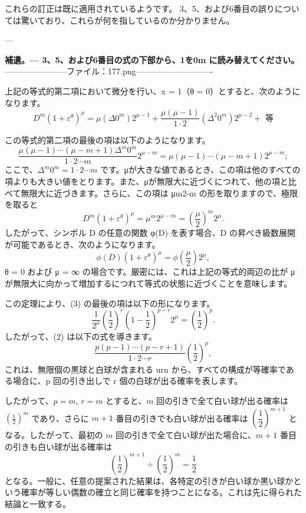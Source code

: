 \documentclass[a4paper,11pt,openany]{ltjsbook}
\begin{document}
これらの訂正は既に適用されているようです。
3、5、および6番目の誤りについては驚いており、これらが何を指しているのか分かりません。

---

\textbf{補遺。--- 3、5、および6番目の式の下部から、1を0m に読み替えてください。}
-----------------------ファイル：177.png----------------------------

上記の等式的第二項において微分を行い、x = 1（θ = 0）とすると、次のようになります。
\[
D^m(1 + \varepsilon^\theta)^\mu
= \mu(\Delta 0^m)2^{\mu-1}
+ \frac{\mu(\mu-1)}{1 \cdot 2}(\Delta^2 0^m)2^{\mu-2}
+ \text{ 等}
\]

この等式的第二項の最後の項は以下のようになります。
\[
\frac{\mu(\mu-1)\cdots (\mu-m+1)\Delta^m 0^m}{1 \cdot 2 \cdots m}2^{\mu-m}
= \mu(\mu-1)\cdots (\mu-m+1)2^{\mu-m};
\]
ここで、\(\Delta^m 0^m = 1 \cdot 2 \cdots m\) です。μが大きな値であるとき、この項は他のすべての項よりも大きい値をとります。また、μが無限大に近づくにつれて、他の項と比べて無限大に近づきます。さらに、この項は μm2{\mu-m} の形を取りますので、極限を取ると
\[
D^m(1 + \varepsilon^\theta)^\mu = \mu^m 2^{\mu-m}
= \left(\frac{\mu}{2}\right)^m 2^\mu.
\]
したがって、シンボル D の任意の関数 φ(D) を表す場合、D の昇べき級数展開が可能であるとき、次のようになります。
\[
\phi(D)(1 + \varepsilon^\theta)^\mu = \phi\left(\frac{\mu}{2}\right)2^\mu,  \tag{4}
\]
θ = 0 および μ = ∞ の場合です。厳密には、これは上記の等式的両辺の比が μ が無限大に向かって増加するにつれて等式の状態に近づくことを意味します。

この定理により、(3) の最後の項は以下の形になります。
\[
\frac{1}{2^\mu} \left(\frac{1}{2}\right)^r
\left(1 - \frac{1}{2}\right)^{p-r} 2^\mu
= \left(\frac{1}{2}\right)^p.
\]
したがって、(2) は以下の式を導きます。
\[
\frac{p(p-1)\cdots (p-r+1)}{1 \cdot 2 \cdots r} \left(\frac{1}{2}\right)^p,
\]
これは、無限個の黒球と白球が含まれる urn から、すべての構成が等確率である場合に、p 回の引き出しで r 個の白球が出る確率を表します。

したがって、$p = m$, $r = m$ とすると、$m$ 回の引きで全て白い球が出る確率は $\left( \frac{1}{2} \right)^m$ であり、さらに $m+1$ 番目の引きでも白い球が出る確率は $\left(\dfrac{1}{2}\right)^{m+1}$ となる。したがって、最初の $m$ 回の引きで全て白い球が出た場合に、$m+1$ 番目の引きも白い球が出る確率は
\[
  \left( \frac{1}{2} \right)^{m+1} \div
  \left( \frac{1}{2} \right)^m = \frac{1}{2}
\]
となる。一般に、任意の提案された結果は、各特定の引きが白い球か黒い球かという確率が等しい偶数の確立と同じ確率を持つことになる。これは先に得られた結論と一致する。
\end{document}
